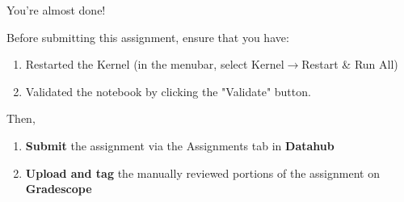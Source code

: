 \documentclass[11pt]{article}
\providecommand{\tightlist}{%
      \setlength{\itemsep}{0pt}\setlength{\parskip}{0pt}}
\begin{document}
You're almost done!

Before submitting this assignment, ensure that you have:

\begin{enumerate}
\def\labelenumi{\arabic{enumi}.}
\tightlist
\item
  Restarted the Kernel (in the menubar, select
  Kernel\(\rightarrow\)Restart \& Run All)
\item
  Validated the notebook by clicking the "Validate" button.
\end{enumerate}

Then,

\begin{enumerate}
\def\labelenumi{\arabic{enumi}.}
\tightlist
\item
  \textbf{Submit} the assignment via the Assignments tab in
  \textbf{Datahub}
\item
  \textbf{Upload and tag} the manually reviewed portions of the
  assignment on \textbf{Gradescope}
\end{enumerate}


    
    
    
    
\end{document}
